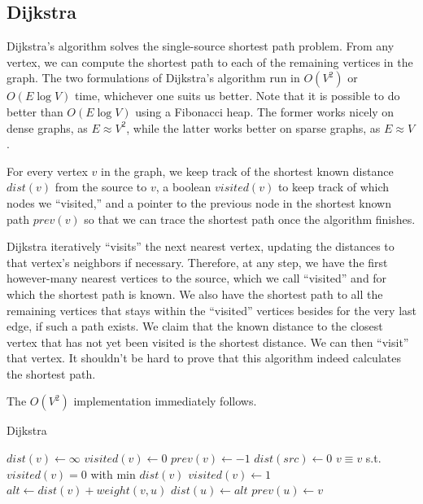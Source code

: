 \documentclass[11pt]{book}
\begin{document}
\subsection{Dijkstra}

Dijkstra's algorithm solves the single-source shortest path problem. From any vertex, we can compute the shortest path to each of the remaining vertices in the graph. The two formulations of Dijkstra's algorithm run in $O(V^2)$ or $O(E\log{V})$ time, whichever one suits us better. Note that it is possible to do better than $O(E\log{V})$ using a Fibonacci heap. The former works nicely on dense graphs, as $E \approx V^2$, while the latter works better on sparse graphs, as $E \approx V$.

For every vertex $v$ in the graph, we keep track of the shortest known distance $dist(v)$ from the source to $v$, a boolean $visited(v)$ to keep track of which nodes we ``visited,'' and a pointer to the previous node in the shortest known path $prev(v)$ so that we can trace the shortest path once the algorithm finishes.

Dijkstra iteratively ``visits'' the next nearest vertex, updating the distances to that vertex's neighbors if necessary. Therefore, at any step, we have the first however-many nearest vertices to the source, which we call ``visited'' and for which the shortest path is known. We also have the shortest path to all the remaining vertices that stays within the ``visited'' vertices besides for the very last edge, if such a path exists. We claim that the known distance to the closest vertex that has not yet been visited is the shortest distance. We can then ``visit'' that vertex. It shouldn't be hard to prove that this algorithm indeed calculates the shortest path.

The $O(V^2)$ implementation immediately follows.

\begin{algorithm}[H]
\caption{Dijkstra}
\begin{algorithmic}
	\State $dist(v) \gets \infty$
	\State $visited(v) \gets 0$
    \State $prev(v) \gets -1$
\EndFor
\State $dist(src) \gets 0$
	\State $v \equiv v$ s.t. $visited(v)=0$ with min $dist(v)$
    \State $visited(v) \gets 1$
    		\State $alt \gets dist(v) + weight(v, u)$
				\State $dist(u) \gets alt$
   	        	\State $prev(u) \gets v$
			\EndIf
        \EndIf
    \EndFor
\EndWhile
\end{algorithmic}
\end{algorithm}
\end{document}

